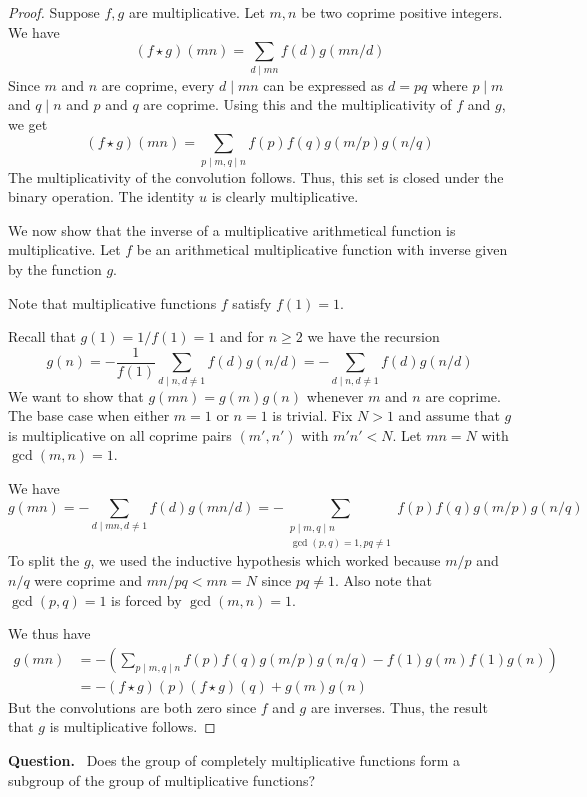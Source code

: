 \documentclass[10pt,openany]{book}
\theoremstyle{italicnonumber}
\theoremstyle{definition}
\newenvironment{question}{\par\vspace{1ex}\noindent\textbf{Question.}\ }{\par}
\begin{document}
\begin{proof}
  Suppose $f,g$ are multiplicative. Let $m,n$ be two coprime positive integers. We have
  \[
  (f \star g)(mn) = \sum_{d \mid mn} f(d) g(mn/d)
  \]
  Since $m$ and $n$ are coprime, every $d \mid mn$ can be expressed as $d = pq$ where $p \mid m$ and $q \mid n$ and $p$ and $q$ are coprime. Using this and the multiplicativity of $f$ and $g$, we get
  \[
  (f \star g)(mn) = \sum_{p \mid m, q \mid n} f(p) f(q) g(m/p) g(n/q)
  \]
  The multiplicativity of the convolution follows. Thus, this set is closed under the binary operation. The identity $u$ is clearly multiplicative.

  We now show that the inverse of a multiplicative arithmetical function is multiplicative. Let $f$ be an arithmetical multiplicative function with inverse given by the function $g$.

  Note that multiplicative functions $f$ satisfy $f(1)=1$.

  Recall that $g(1) = 1/f(1) = 1$ and for $n \geq 2$ we have the recursion
  \[
  g(n) = -\frac{1}{f(1)} \sum_{d \mid n, d \neq 1} f(d) g(n/d) = - \sum_{d \mid n, d \neq 1} f(d) g(n/d) 
  \]
  We want to show that $g(mn)=g(m)g(n)$ whenever $m$ and $n$ are coprime. The base case when either $m=1$ or $n=1$ is trivial. Fix $N>1$ and assume that $g$ is multiplicative on all coprime pairs $(m',n')$ with $m'n' < N$. Let $mn=N$ with $\gcd(m,n)=1$.

  We have
  \[
  g(mn) = -\sum_{d \mid mn, d \neq 1} f(d) g(mn/d) = - \sum_{\substack{p \mid m, q \mid n \\ \gcd(p,q)=1, pq \neq 1}} f(p) f(q) g(m/p) g(n/q)
  \]
  To split the $g$, we used the inductive hypothesis which worked because $m/p$ and $n/q$ were coprime and $mn/pq < mn = N$ since $pq \neq 1$. Also note that $\gcd(p,q)=1$ is forced by $\gcd(m,n)=1$.

  We thus have
  \[
  \begin{aligned}
    g(mn) & = - \left( \sum_{p \mid m, q \mid n} f(p) f(q) g(m/p) g(n/q) - f(1)g(m)f(1)g(n) \right) \\
    & = - (f\star g)(p) (f\star g)(q) + g(m)g(n)
  \end{aligned}
  \]
  But the convolutions are both zero since $f$ and $g$ are inverses. Thus, the result that $g$ is multiplicative follows.
\end{proof}

\begin{question}
  Does the group of completely multiplicative functions form a subgroup of the group of multiplicative functions?
\end{question}
\end{document}
